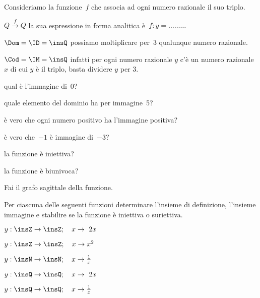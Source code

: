 \begin{esercizio}
 \label{ese:D.10}
Consideriamo la funzione~$f$ che associa ad ogni numero razionale il suo triplo.

$Q\overset{{f}}{{\rightarrow }}Q$ la sua espressione in forma
analitica è~$f: y = {\dots}{\dots}{\dots}$

$\Dom = \ID = \insQ$ possiamo moltiplicare per~3 qualunque numero razionale.

$\Cod = \IM =\insQ$ infatti per ogni numero razionale $y$ c'è un numero 
razionale $x$ di cui $y$ è il triplo, basta dividere $y$ per 3.
%

\begin{enumeratea}
\item qual è l'immagine di~0?\dotfill
\item quale elemento del dominio ha per immagine~5?\dotfill
\item è vero che ogni numero positivo ha l'immagine positiva?\dotfill
\item è vero che~$-1$ è immagine di~$-3$?\dotfill
\item la funzione è iniettiva?
\item la funzione è biunivoca?
\end{enumeratea}
Fai il grafo sagittale della funzione.
\end{esercizio}

\begin{esercizio}
 \label{ese:D.11}
Per ciascuna delle seguenti funzioni determinare l'insieme di definizione, 
l'insieme
immagine e stabilire se la funzione è iniettiva o suriettiva.

\begin{enumeratea}
 \item $y:\insZ\rightarrow\insZ;\quad x\rightarrow~2x$
\item $y:\insZ\rightarrow\insZ;\quad x\rightarrow x^{2}$
\item $y:\insN\rightarrow\insN;\quad x\rightarrow \frac{1}{x}$
\item $y:\insQ\rightarrow\insQ;\quad x\rightarrow~2x$
\item $y:\insQ\rightarrow\insQ;\quad x\rightarrow \frac{1}{x}$
\end{enumeratea}
\end{esercizio}

